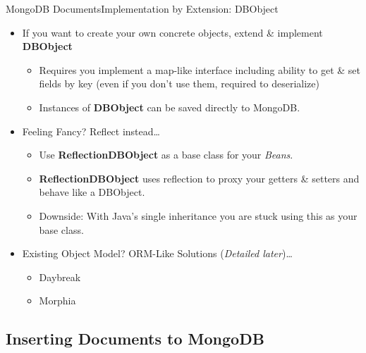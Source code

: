 \documentclass{beamer}
\begin{document}
\begin{frame}{MongoDB Documents}{Implementation by Extension: DBObject}
    \begin{itemize}
        \item If you want to create your own concrete objects, extend \& implement {\bf DBObject}
            \begin{itemize}
                \item Requires you implement a map-like interface including ability to get \& set fields by key (even if you don't use them, required to deserialize)
                \item Instances of {\bf DBObject} can be saved directly to MongoDB.
            \end{itemize}
        \item Feeling Fancy? Reflect instead\dots
            \begin{itemize}
                \item Use {\bf ReflectionDBObject} as a base class for your {\em Beans}.
                \item {\bf ReflectionDBObject} uses reflection to proxy your getters \& setters and behave like a DBObject.
                \item Downside: With Java's single inheritance you are stuck using this as your base class.
            \end{itemize}
        \item Existing Object Model? ORM-Like Solutions (\textsl{Detailed later})\dots
            \begin{itemize}
                \item Daybreak 
                \item Morphia
            \end{itemize}
              
    \end{itemize}
\end{frame}

\subsection[Inserting Documents to MongoDB]{Inserting Documents to MongoDB}
\end{document}
